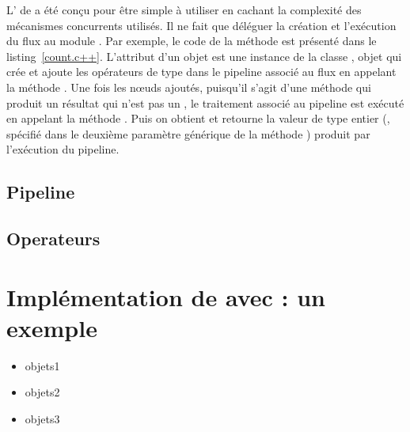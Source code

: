 L' de  a \'et\'e con\c {c}u pour \^etre simple \`a utiliser en cachant la complexit\'e des m\'ecanismes concurrents utilis\'es. Il ne fait que d\'el\'eguer la cr\'eation et l'ex\'ecution du flux au module . Par exemple, le code de la m\'ethode  est pr\'esent\'e dans le listing~\ref{count.c++}. L'attribut  d'un objet  est une instance de la classe , objet qui cr\'ee et ajoute les op\'erateurs de type  dans le pipeline associé au flux en appelant la m\'ethode . Une fois les n\oe{}uds ajoutés, puisqu'il s'agit d'une méthode qui produit un résultat qui n'est pas un , le traitement associé au pipeline  est ex\'ecut\'e en appelant la m\'ethode . Puis on obtient et retourne la valeur de type entier (, sp\'ecifi\'e dans le deuxi\`eme param\`etre générique de la m\'ethode ) produit par l'exécution du pipeline.

\subsection{Pipeline}
\subsection{Operateurs}


\section{Impl\'ementation de  avec  : un exemple}


\begin{itemize}

\item objets1 

\item objets2 

\item objets3 


\end{itemize}

